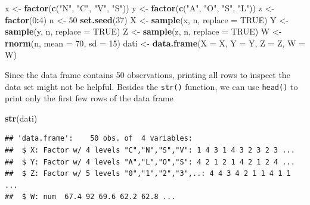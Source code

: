 \documentclass[
]{article}
\newenvironment{Shaded}{\begin{snugshade}}{\end{snugshade}}
\newcommand{\AttributeTok}[1]{\textcolor[rgb]{0.13,0.29,0.53}{#1}}
\newcommand{\ConstantTok}[1]{\textcolor[rgb]{0.56,0.35,0.01}{#1}}
\newcommand{\DecValTok}[1]{\textcolor[rgb]{0.00,0.00,0.81}{#1}}
\newcommand{\FunctionTok}[1]{\textcolor[rgb]{0.13,0.29,0.53}{\textbf{#1}}}
\newcommand{\NormalTok}[1]{#1}
\newcommand{\OtherTok}[1]{\textcolor[rgb]{0.56,0.35,0.01}{#1}}
\newcommand{\SpecialCharTok}[1]{\textcolor[rgb]{0.81,0.36,0.00}{\textbf{#1}}}
\newcommand{\StringTok}[1]{\textcolor[rgb]{0.31,0.60,0.02}{#1}}
\begin{document}
\begin{Shaded}
\begin{Highlighting}[]
\NormalTok{x }\OtherTok{\textless{}{-}} \FunctionTok{factor}\NormalTok{(}\FunctionTok{c}\NormalTok{(}\StringTok{"N"}\NormalTok{, }\StringTok{"C"}\NormalTok{, }\StringTok{"V"}\NormalTok{, }\StringTok{"S"}\NormalTok{))}
\NormalTok{y }\OtherTok{\textless{}{-}} \FunctionTok{factor}\NormalTok{(}\FunctionTok{c}\NormalTok{(}\StringTok{"A"}\NormalTok{, }\StringTok{"O"}\NormalTok{, }\StringTok{"S"}\NormalTok{, }\StringTok{"L"}\NormalTok{))}
\NormalTok{z }\OtherTok{\textless{}{-}} \FunctionTok{factor}\NormalTok{(}\DecValTok{0}\SpecialCharTok{:}\DecValTok{4}\NormalTok{)}
\NormalTok{n }\OtherTok{\textless{}{-}} \DecValTok{50}
\FunctionTok{set.seed}\NormalTok{(}\DecValTok{37}\NormalTok{)}
\NormalTok{X }\OtherTok{\textless{}{-}} \FunctionTok{sample}\NormalTok{(x, n, }\AttributeTok{replace =} \ConstantTok{TRUE}\NormalTok{)}
\NormalTok{Y }\OtherTok{\textless{}{-}} \FunctionTok{sample}\NormalTok{(y, n, }\AttributeTok{replace =} \ConstantTok{TRUE}\NormalTok{)}
\NormalTok{Z }\OtherTok{\textless{}{-}} \FunctionTok{sample}\NormalTok{(z, n, }\AttributeTok{replace =} \ConstantTok{TRUE}\NormalTok{)}
\NormalTok{W }\OtherTok{\textless{}{-}} \FunctionTok{rnorm}\NormalTok{(n, }\AttributeTok{mean =} \DecValTok{70}\NormalTok{, }\AttributeTok{sd =} \DecValTok{15}\NormalTok{)}
\NormalTok{dati }\OtherTok{\textless{}{-}} \FunctionTok{data.frame}\NormalTok{(}\AttributeTok{X =}\NormalTok{ X, }\AttributeTok{Y =}\NormalTok{ Y, }\AttributeTok{Z =}\NormalTok{ Z, }\AttributeTok{W =}\NormalTok{ W)}
\end{Highlighting}
\end{Shaded}

Since the data frame contains 50 observations, printing all rows to
inspect the data set might not be helpful. Besides the \texttt{str()}
function, we can use \texttt{head()} to print only the first few rows of
the data frame

\begin{Shaded}
\begin{Highlighting}[]
\FunctionTok{str}\NormalTok{(dati)}
\end{Highlighting}
\end{Shaded}

\begin{verbatim}
## 'data.frame':    50 obs. of  4 variables:
##  $ X: Factor w/ 4 levels "C","N","S","V": 1 4 3 1 4 3 2 3 2 3 ...
##  $ Y: Factor w/ 4 levels "A","L","O","S": 4 2 1 2 1 4 2 1 2 4 ...
##  $ Z: Factor w/ 5 levels "0","1","2","3",..: 4 4 3 4 2 1 1 4 1 1 ...
##  $ W: num  67.4 92 69.6 62.2 62.8 ...
\end{verbatim}
\end{document}
